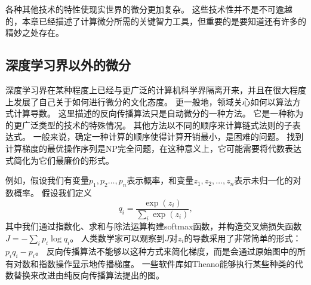 各种其他技术的特性使现实世界的微分更加复杂。 这些技术性并不是不可逾越的，本章已经描述了计算微分所需的关键智力工具，但重要的是要知道还有许多的精妙之处存在。
  
  
\subsection{深度学习界以外的微分}
\label{sec:differentiation_outside_the_deep_learning_community}

深度学习界在某种程度上已经与更广泛的计算机科学界隔离开来，并且在很大程度上发展了自己关于如何进行微分的文化态度。
更一般地，领域关心如何以算法方式计算导数。 
这里描述的反向传播算法只是自动微分的一种方法。 
它是一种称为的更广泛类型的技术的特殊情况。 
其他方法以不同的顺序来计算链式法则的子表达式。 
一般来说，确定一种计算的顺序使得计算开销最小，是困难的问题。 
找到计算梯度的最优操作序列是NP完全问题\citep{naumann2008optimal}，在这种意义上，它可能需要将代数表达式简化为它们最廉价的形式。

例如，假设我们有变量$p_1,p_2\ldots,p_n$表示概率，和变量$z_1,z_2,\ldots,z_n$表示未归一化的对数概率。
假设我们定义
\begin{equation}
  q_i = \frac{\exp(z_i)}{\sum_i \exp(z_i)},
\end{equation}
其中我们通过指数化、求和与除法运算构建softmax函数，并构造交叉熵损失函数$J=-\sum_i p_i\log q_i$。
人类数学家可以观察到$J$对$z_i$的导数采用了非常简单的形式：$p_iq_i-p_i$。
反向传播算法不能够以这种方式来简化梯度，而是会通过原始图中的所有对数和指数操作显示地传播梯度。
一些软件库如Theano\citep{bergstra+al:2010-scipy-small,Bastien-Theano-2012}能够执行某些种类的代数替换来改进由纯反向传播算法提出的图。
  
  
